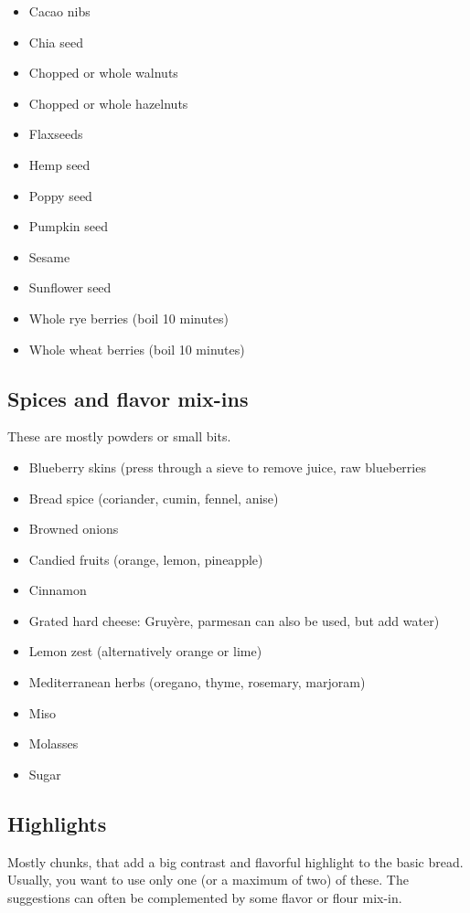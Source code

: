 \begin{itemize}
  \item Cacao nibs
  \item Chia seed
  \item Chopped or whole walnuts
  \item Chopped or whole hazelnuts
  \item Flaxseeds
  \item Hemp seed
  \item Poppy seed
  \item Pumpkin seed
  \item Sesame
  \item Sunflower seed
  \item Whole rye berries (boil 10 minutes)
  \item Whole wheat berries (boil 10 minutes)
\end{itemize}

\subsection{Spices and flavor mix-ins}
These are mostly powders or small bits.

\begin{itemize}
  \item Blueberry skins (press through a sieve to remove juice, raw blueberries
  \item Bread spice (coriander, cumin, fennel, anise)
  \item Browned onions
  \item Candied fruits (orange, lemon, pineapple)
  \item Cinnamon
  \item Grated hard cheese: Gruyère, parmesan
      can also be used, but add water)
  \item Lemon zest (alternatively orange or lime)
  \item Mediterranean herbs (oregano, thyme, rosemary, marjoram)
  \item Miso
  \item Molasses
  \item Sugar
\end{itemize}

\subsection{Highlights}
Mostly chunks, that add a big contrast and flavorful highlight to the basic
bread. Usually, you want to use only one (or a maximum of two) of these. The suggestions
can often be complemented by some flavor or flour mix-in.

